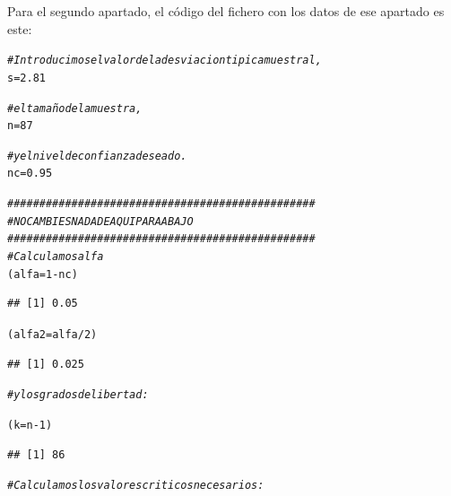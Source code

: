 \documentclass[10pt,a4paper]{article}\usepackage[]{graphicx}\usepackage[]{color}
\makeatletter
\newcommand{\hlnum}[1]{\textcolor[rgb]{0.686,0.059,0.569}{#1}}%
\newcommand{\hlcom}[1]{\textcolor[rgb]{0.678,0.584,0.686}{\textit{#1}}}%
\newcommand{\hlopt}[1]{\textcolor[rgb]{0,0,0}{#1}}%
\newcommand{\hlstd}[1]{\textcolor[rgb]{0.345,0.345,0.345}{#1}}%
\newcommand{\hlkwb}[1]{\textcolor[rgb]{0.69,0.353,0.396}{#1}}%
\newenvironment{kframe}{%
 \def\at@end@of@kframe{}%
 \ifinner\ifhmode%
  \def\at@end@of@kframe{\end{minipage}}%
  \begin{minipage}{\columnwidth}%
 \fi\fi%
 \def\FrameCommand##1{\hskip\@totalleftmargin \hskip-\fboxsep
 \colorbox{shadecolor}{##1}\hskip-\fboxsep
     \hskip-\linewidth \hskip-\@totalleftmargin \hskip\columnwidth}%
 \MakeFramed {\advance\hsize-\width
   \@totalleftmargin\z@ \linewidth\hsize
   \@setminipage}}%
 {\par\unskip\endMakeFramed%
 \at@end@of@kframe}
\newenvironment{knitrout}{}{} %
\makeatother
\begin{document}
Para el segundo apartado, el código del fichero con los datos de ese apartado es este:
\begin{knitrout}
\color{fgcolor}\begin{kframe}
\begin{alltt}
\hlcom{# Introducimos el valor de la desviacion tipica muestral,}
\hlstd{s} \hlkwb{=} \hlnum{2.81}

\hlcom{# el tamaño de la muestra,}
\hlstd{n} \hlkwb{=} \hlnum{87}

\hlcom{# y el nivel de confianza deseado.}
\hlstd{nc} \hlkwb{=} \hlnum{0.95}

\hlcom{################################################}
\hlcom{#NO CAMBIES NADA DE AQUI PARA ABAJO}
\hlcom{################################################}
\hlcom{# Calculamos alfa}
\hlstd{(alfa} \hlkwb{=} \hlnum{1} \hlopt{-} \hlstd{nc)}
\end{alltt}
\begin{verbatim}
## [1] 0.05
\end{verbatim}
\begin{alltt}
\hlstd{(alfa2} \hlkwb{=} \hlstd{alfa} \hlopt{/} \hlnum{2}\hlstd{)}
\end{alltt}
\begin{verbatim}
## [1] 0.025
\end{verbatim}
\begin{alltt}
\hlcom{# y los grados de libertad:}

\hlstd{(k}\hlkwb{=} \hlstd{n} \hlopt{-} \hlnum{1}\hlstd{)}
\end{alltt}
\begin{verbatim}
## [1] 86
\end{verbatim}
\begin{alltt}
\hlcom{# Calculamos los valores criticos necesarios:}


\end{alltt}
\end{kframe}
\end{knitrout}
\end{document}

